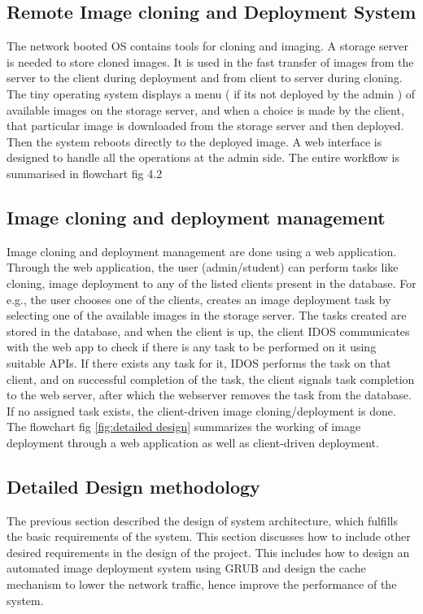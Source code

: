 \documentclass[a4paper,12pt]{article}
\begin{document}
\subsection{ Remote Image cloning and Deployment System}
  The network booted OS contains tools for cloning and imaging. A storage server is needed to store cloned images. It is used in the fast transfer of images from the server to the client during deployment and from client to server during cloning.
  The tiny operating system displays a menu ( if its not deployed by the admin ) of available images on the storage server, and when a choice is made by the client, that particular image is downloaded from the storage server and then deployed. Then the system reboots directly to the deployed image. A web interface is designed to handle all the operations at the admin side.
  The entire workflow is summarised in flowchart fig 4.2
  \newline
\subsection{ Image cloning and deployment management}
Image cloning and deployment management are done using a web application. Through the web application, the user (admin/student) can perform tasks like cloning, image deployment to any of the listed clients present in the database. For e.g., the user chooses one of the clients, creates an image deployment task by selecting one of the available images in the storage server. The tasks created are stored in the database, and when the client is up, the client IDOS communicates with the web app to check if there is any task to be performed on it using suitable APIs. If there exists any task for it, IDOS performs the task on that client, and on successful completion of the task, the client signals task completion to the web server, after which the webserver removes the task from the database. If no assigned task exists, the client-driven image cloning/deployment is done. The flowchart fig \ref{fig:detailed design} summarizes the working of image deployment through a web application as well as client-driven deployment.
\subsection{Detailed Design methodology}
The previous section described the design of system architecture, which fulfills the basic requirements of the system. This section discusses how to include other desired requirements in the design of the project. This includes how to design an automated image deployment system using GRUB  and design the cache mechanism to lower the network traffic, hence improve the performance of the system.
\end{document}
